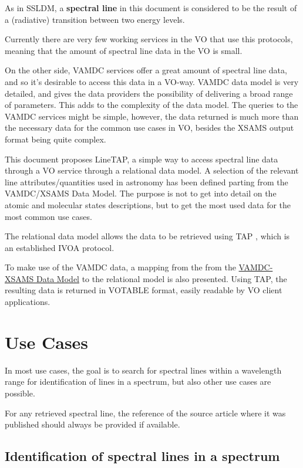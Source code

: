 \documentclass[11pt,a4paper]{ivoa}
\begin{document}
As  in SSLDM, a \textbf{spectral line} in this document is considered to be the result of a (radiative) 
transition between two energy levels.

Currently there are very few working services in the VO that use this protocols, meaning 
that the amount of spectral line data in the VO is small. 

On the other side, VAMDC services offer a great amount of spectral line data, and  so it's 
desirable to access this data in a VO-way. VAMDC data model is very detailed, and gives 
the data providers the possibility of delivering a broad range of parameters. This 
adds to the complexity of the data model.
The queries to the VAMDC services might be simple, however, the data returned is much 
more than the necessary data for the common use cases in VO, besides the XSAMS 
\citep{XSAMS:Docs} output format being quite complex.


This document proposes LineTAP, a simple way to access spectral line data through a VO 
service through a relational data model.  A selection of the relevant line attributes/quantities used in 
astronomy has been defined parting from the VAMDC/XSAMS Data Model. The purpose is not to
get into detail on the atomic and molecular states descriptions, but to get the most used data for 
the most common use cases. 

The relational data model allows the data to be retrieved using TAP \citep{std:TAP}, which is an 
established IVOA protocol. 

To make use of the VAMDC data, a mapping from the from the 
\href{https://standards.vamdc.eu/#data-model}{VAMDC-XSAMS 
Data Model} to the relational model is 
also presented. Using TAP, the resulting data is returned in VOTABLE format,  easily 
readable by VO client applications. 




\section{Use Cases}

In most use cases, the goal is to search for spectral lines within a wavelength range for identification
of lines in a spectrum, but also other use cases are possible.

For any retrieved spectral line, the reference of the source article where it was published
should always be provided if available.



\subsection{Identification of spectral lines in a spectrum}
\end{document}

